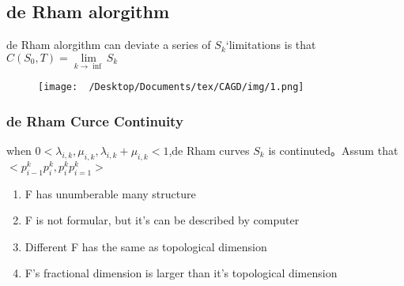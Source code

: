 \newpage


\subsection{de Rham alorgithm}
de Rham alorgithm can deviate a series of $S_k$‘limitations is that $C(S_0,T) = \lim\limits_{k\rightarrow \inf}S_k$


\begin{figure}
	\begin{center}
		\texttt{[image: ~/Desktop/Documents/tex/CAGD/img/1.png]}
	\end{center}
	\caption{}\label{fig:}
\end{figure}

\subsubsection{de Rham Curce Continuity}

\begin{property}[Continuity]
	when $0<\lambda _{i,k},\mu_{i,k},\lambda_{i,k}+\mu_{i,k}<1$,de Rham curves $S_k$ is continuted。Assum that $<p_{i-1}^{k}p_{i}^{k},p_{i}^{k}p_{i=1}^{k}>$
\end{property}

\begin{property}
	\begin{enumerate}
		\item F has unumberable many structure
		\item F is not formular, but it's can be described by computer
		\item Different F has the same as topological dimension
		\item F's fractional dimension is larger than it's topological dimension
	\end{enumerate}
\end{property}
